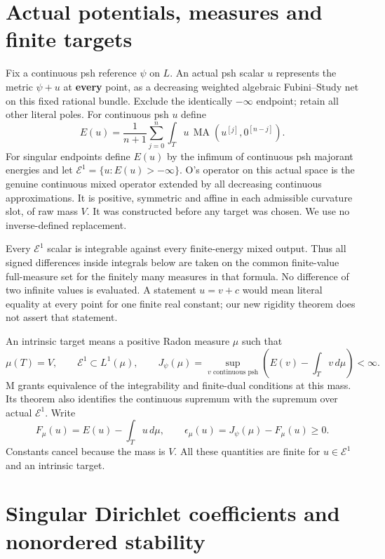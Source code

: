 \documentclass[
  11pt,
]{article}
\begin{document}
\section{Actual potentials, measures and finite
targets}\label{actual-potentials-measures-and-finite-targets}

Fix a continuous psh reference \(\psi\) on \(L\). An actual psh scalar
\(u\) represents the metric \(\psi+u\) at \textbf{every} point, as a
decreasing weighted algebraic Fubini--Study net on this fixed rational
bundle. Exclude the identically \(-\infty\) endpoint; retain all other
literal poles. For continuous psh \(u\) define \[
 E(u)=\frac1{n+1}\sum_{j=0}^n
     \int_Tu\,\operatorname{MA}(u^{[j]},0^{[n-j]}).
\] For singular endpoints define \(E(u)\) by the infimum of continuous
psh majorant energies and let \(\mathcal E^1=\{u:E(u)>-\infty\}\). O's
operator on this actual space is the genuine continuous mixed operator
extended by all decreasing continuous approximations. It is positive,
symmetric and affine in each admissible curvature slot, of raw mass
\(V\). It was constructed before any target was chosen. We use no
inverse-defined replacement.

Every \(\mathcal E^1\) scalar is integrable against every finite-energy
mixed output. Thus all signed differences inside integrals below are
taken on the common finite-value full-measure set for the finitely many
measures in that formula. No difference of two infinite values is
evaluated. A statement \(u=v+c\) would mean literal equality at every
point for one finite real constant; our new rigidity theorem does not
assert that statement.

An intrinsic target means a positive Radon measure \(\mu\) such that \[
 \mu(T)=V,\qquad \mathcal E^1\subset L^1(\mu),
 \qquad
 J_\psi(\mu)=\sup_{v\text{ continuous psh}}
       \left(E(v)-\int_Tv\,d\mu\right)<\infty.                 \tag{1}
\] M grants equivalence of the integrability and finite-dual conditions
at this mass. Its theorem also identifies the continuous supremum with
the supremum over actual \(\mathcal E^1\). Write \[
 F_\mu(u)=E(u)-\int_Tu\,d\mu,\qquad
 \epsilon_\mu(u)=J_\psi(\mu)-F_\mu(u)\geq0.                  \tag{2}
\] Constants cancel because the mass is \(V\). All these quantities are
finite for \(u\in\mathcal E^1\) and an intrinsic target.

\section{Singular Dirichlet coefficients and nonordered
stability}\label{singular-dirichlet-coefficients-and-nonordered-stability}
\end{document}
